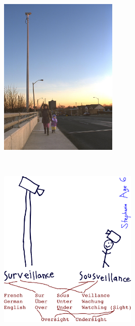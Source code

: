 \begin{figure}[t!]
  \begin{subfigure}[t]{3.0in}
    \centering
    \includegraphics[height=3.0in]{ch6/figs/trafficcam.jpg}
    \label{subfig:surveillancetrafficcam}
    \caption{}
  \end{subfigure}
~
  \begin{subfigure}[t]{3.0in}
   \centering
   \includegraphics[height=3.0in]{ch6/figs/stephanie_sur_sousveillance_ink_drawing_words_colorized_4colors_closecrop_name.pdf}
   \label{subfig:stephanieveillance}
   \caption{}
   \end{subfigure}


\end{figure}
